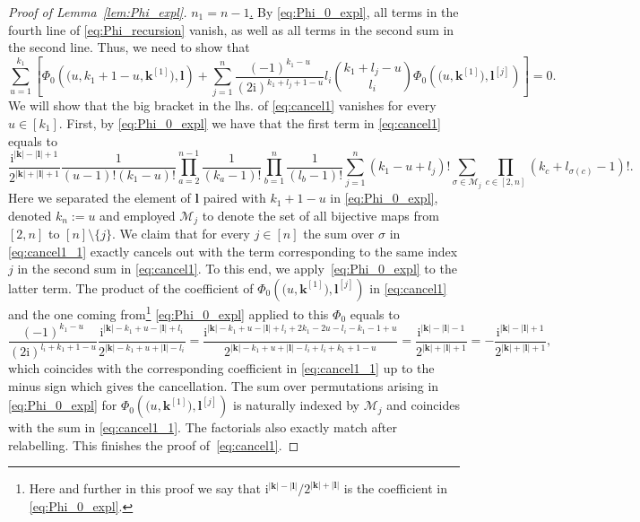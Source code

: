 \documentclass[10pt]{amsart}
\numberwithin{equation}{section}
\newcommand{\ii}{\mathrm{i}}
\begin{document}
\begin{proof}[Proof of Lemma~\ref{lem:Phi_expl}]
\smallskip

\noindent\underline{$n_1=n-1$.} By \eqref{eq:Phi_0_expl}, all terms in the fourth line of \eqref{eq:Phi_recursion} vanish, as well as all terms in the second sum in the second line. Thus, we need to show that
\begin{equation}
\sum_{u=1}^{k_1} \left[\Phi_0\left(\big(u,k_1+1-u,\bm{k}^{[1]}\big),\bm{l}\right) + \sum_{j=1}^n \frac{(-1)^{k_1-u}}{(2\ii)^{k_1+l_j+1-u}} l_i\binom{k_1+l_j-u}{l_i}\Phi_{0}\left( \big(u, \bm{k}^{[1]}\big), \bm{l}^{[j]}\right)\right]=0.
\label{eq:cancel1}
\end{equation}
We will show that the big bracket in the lhs. of \eqref{eq:cancel1} vanishes for every $u\in [k_1]$. First, by \eqref{eq:Phi_0_expl} we have that the first term in \eqref{eq:cancel1} equals to
\begin{equation}
\frac{\ii^{|\bm{k}|-|\bm{l}|+1}}{2^{|\bm{k}|+|\bm{l}|+1}} \frac{1}{(u-1)!(k_1-u)!}\prod_{a=2}^{n-1}\frac{1}{(k_a-1)!}\prod_{b=1}^n \frac{1}{(l_b-1)!}\sum_{j=1}^n (k_1-u+l_j)!\sum_{\sigma\in \mathcal{M}_j} \prod_{c\in [2,n]} (k_c+l_{\sigma(c)}-1)!.
\label{eq:cancel1_1}
\end{equation}
Here we separated the element of $\bm{l}$ paired with $k_1+1-u$ in \eqref{eq:Phi_0_expl}, denoted $k_n:=u$ and employed $\mathcal{M}_j$ to denote the set of all bijective maps from  $[2,n]$ to $[n]\setminus\{j\}$. We claim that for every $j\in [n]$ the sum over $\sigma$ in \eqref{eq:cancel1_1} exactly cancels out with the term corresponding to the same index $j$ in the second sum in \eqref{eq:cancel1}. To this end, we apply~\eqref{eq:Phi_0_expl} to the latter term. The product of the coefficient of $\Phi_{0}\left( \big(u, \bm{k}^{[1]}\big), \bm{l}^{[j]}\right)$ in \eqref{eq:cancel1} and the one coming from\footnote{Here and further in this proof we say that $\ii^{|\bm{k}|-|\bm{l}|}/2^{|\bm{k}|+|\bm{l}|}$ is the coefficient in \eqref{eq:Phi_0_expl}.} \eqref{eq:Phi_0_expl} applied to this $\Phi_0$ equals to
\begin{equation}
\frac{(-1)^{k_1-u}}{(2\ii)^{l_i+k_1+1-u}} \frac{\ii^{|\bm{k}|-k_1+u-|\bm{l}|+l_i}}{2^{|\bm{k}|-k_1+u+|\bm{l}|-l_i}} = \frac{\ii^{|\bm{k}|-k_1+u-|\bm{l}|+l_i +2k_1-2u -l_i-k_1-1+u}}{2^{|\bm{k}|-k_1+u+|\bm{l}|-l_i +l_i+k_1+1-u}}=\frac{\ii^{|\bm{k}|-|\bm{l}|-1}}{2^{|\bm{k}|+|\bm{l}|+1}} = -\frac{\ii^{|\bm{k}|-|\bm{l}|+1}}{2^{|\bm{k}|+|\bm{l}|+1}},
\label{eq:2_power}
\end{equation}
which coincides with the corresponding coefficient in \eqref{eq:cancel1_1} up to the minus sign which gives the cancellation. The sum over permutations arising in \eqref{eq:Phi_0_expl} for $\Phi_{0}\left( \big(u, \bm{k}^{[1]}\big), \bm{l}^{[j]}\right)$ is naturally indexed by $\mathcal{M}_j$ and coincides with the sum in \eqref{eq:cancel1_1}. The factorials also exactly match after relabelling. This finishes the proof of~\eqref{eq:cancel1}.



\end{proof}
\end{document}
